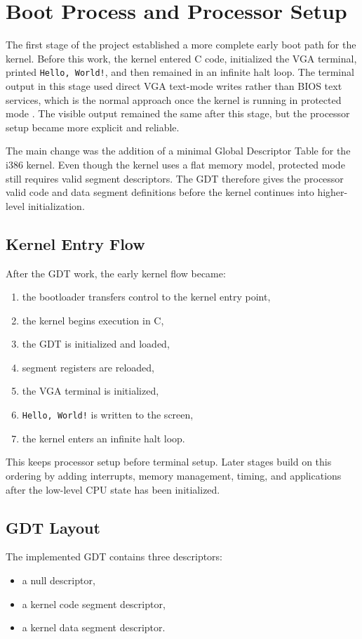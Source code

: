 \section{Boot Process and Processor Setup}

The first stage of the project established a more complete early boot path for the kernel. Before this work, the kernel entered C code, initialized the VGA terminal, printed \texttt{Hello, World!}, and then remained in an infinite halt loop. The terminal output in this stage used direct VGA text-mode writes rather than BIOS text services, which is the normal approach once the kernel is running in protected mode \cite{osdevPrintingToScreen}. The visible output remained the same after this stage, but the processor setup became more explicit and reliable.

The main change was the addition of a minimal Global Descriptor Table for the i386 kernel. Even though the kernel uses a flat memory model, protected mode still requires valid segment descriptors. The GDT therefore gives the processor valid code and data segment definitions before the kernel continues into higher-level initialization\cite{osdevGdtTutorial}.

\subsection{Kernel Entry Flow}
After the GDT work, the early kernel flow became:
\begin{enumerate}
  \item the bootloader transfers control to the kernel entry point,
  \item the kernel begins execution in C,
  \item the GDT is initialized and loaded,
  \item segment registers are reloaded,
  \item the VGA terminal is initialized,
  \item \texttt{Hello, World!} is written to the screen,
  \item the kernel enters an infinite halt loop.
\end{enumerate}

This keeps processor setup before terminal setup. Later stages build on this ordering by adding interrupts, memory management, timing, and applications after the low-level CPU state has been initialized.
\clearpage

\subsection{GDT Layout}
The implemented GDT contains three descriptors:
\begin{itemize}
  \item a null descriptor,
  \item a kernel code segment descriptor,
  \item a kernel data segment descriptor.
\end{itemize}

